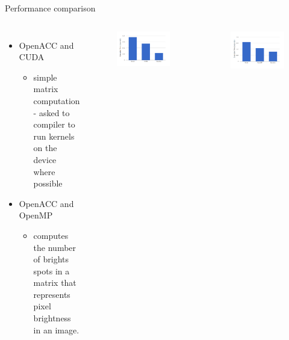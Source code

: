 \documentclass[aspectratio=169]{beamer}
\begin{document}
\begin{frame}[fragile]{Performance comparison}
\begin{columns}

\begin{itemize}
\item OpenACC and CUDA
\begin{itemize}
\item simple matrix computation - asked to compiler to run kernels on the device where possible
\end{itemize}

\item OpenACC and OpenMP
\begin{itemize}
\item computes the number of brights spots in a matrix that represents pixel brightness in an image.
\end{itemize}
\end{itemize}

\begin{figure}
\includegraphics[scale=0.25]{Graphics/CUDA.png}
\end{figure}
\begin{figure}
\includegraphics[scale=0.25]{Graphics/OMP.png}
\end{figure}
\end{columns}

\end{frame}
\end{document}
